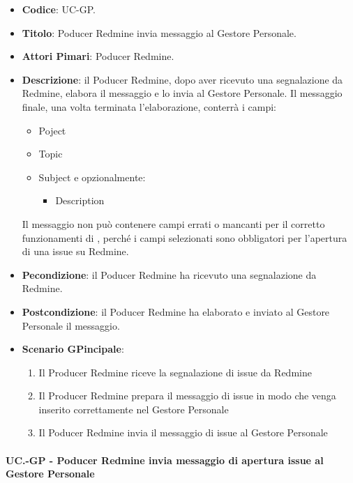 	\begin{itemize}
		\item \textbf{Codice}: UC\theuccount-GP.
		\item \textbf{Titolo}: Poducer Redmine invia messaggio al Gestore Personale.
		\item \textbf{Attori Pimari}: Poducer Redmine.
		\item \textbf{Descrizione}: il Poducer Redmine, dopo aver ricevuto una
		 segnalazione da Redmine, elabora il messaggio e lo invia al Gestore Personale.
		 Il messaggio finale, una volta terminata l'elaborazione, conterrà i campi:
		 \begin{itemize}
		 	\item Poject
		 	\item Topic
		 	\item Subject e opzionalmente:
		 	\begin{itemize}
		 		\item Description
		 	\end{itemize}
		 \end{itemize}
	 	Il messaggio non può contenere campi errati o mancanti per il corretto funzionamenti di \progetto, perché i campi selezionati sono obbligatori per l'apertura di una issue su Redmine.
		\item \textbf{Pecondizione}: il Poducer Redmine ha ricevuto una segnalazione da Redmine.
		\item \textbf{Postcondizione}: il Poducer Redmine ha elaborato e inviato al Gestore Personale il messaggio.
		\item \textbf{Scenario GPincipale}: 
		\begin{enumerate}
			\item Il Producer Redmine riceve la segnalazione di issue da Redmine
			\item Il Producer Redmine prepara il messaggio di issue in modo che venga inserito correttamente nel Gestore Personale
			\item Il Poducer Redmine invia il messaggio di issue al Gestore Personale
		\end{enumerate}
		
	\end{itemize}
	
	\paragraph{UC\theuccount.\thesubuccount-GP - Poducer Redmine invia messaggio di apertura issue al Gestore Personale}
	
